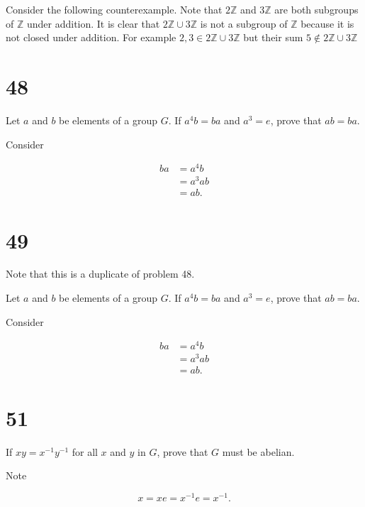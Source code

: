 \documentclass[a4paper]{article}
\begin{document}
\vspace{\baselineskip}

Consider the following counterexample. Note that $2\mathbb{Z}$ and $3\mathbb{Z}$ are both subgroups of $\mathbb{Z}$ under addition. It is clear that $2\mathbb{Z} \cup 3\mathbb{Z}$ is not a subgroup of $\mathbb{Z}$ because it is not closed under addition. For example $2,3 \in 2\mathbb{Z} \cup 3\mathbb{Z}$ but their sum $5 \not\in 2\mathbb{Z} \cup 3\mathbb{Z}$


\section*{48}

Let $a$ and $b$ be elements of a group $G$. If $a^4b = ba$ and $a^3 = e$, prove that $ab = ba$.

\vspace{\baselineskip}

Consider

\begin{align*}
ba &= a^4b \\
&= a^3 ab \\
&= ab.
\end{align*}


\section*{49}

Note that this is a duplicate of problem 48.

Let $a$ and $b$ be elements of a group $G$. If $a^4b = ba$ and $a^3 = e$, prove that $ab = ba$.
\vspace{\baselineskip}

Consider

\begin{align*}
ba &= a^4b \\
&= a^3 ab \\
&= ab.
\end{align*}


\section*{51}

If $xy = x^{-1} y^{-1}$ for all $x$ and $y$ in $G$, prove that $G$ must be abelian.

\vspace{\baselineskip}

Note 

$$x = xe = x^{-1}e = x^{-1}.$$
\end{document}
